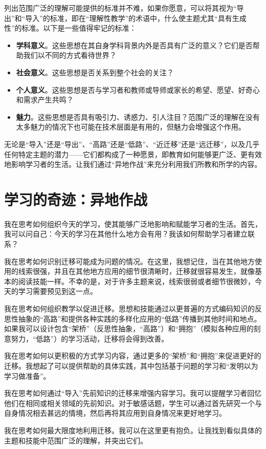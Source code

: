 列出范围广泛的理解可能提供的标准并不难，如果你愿意，可以将其视为“导出”和“导入”的标准，即在“理解性教学”的术语中，什么使主题尤其“具有生成性”的标准。以下是一些值得牢记的标准：
\begin{itemize}
    \item \textbf{学科意义}。这些思想在其自身学科背景内外是否具有广泛的意义？它们是否帮助我们以不同的方式看待世界？
    \item \textbf{社会意义}。这些思想是否关系到整个社会的关注？
    \item \textbf{个人意义}。这些思想是否与学习者和教师或导师或家长的希望、愿望、好奇心和需求产生共鸣？
    \item \textbf{魅力}。这些思想是否具有吸引力、诱惑力、引人注目？范围广泛的理解在没有太多魅力的情况下也可能在技术层面是有用的，但魅力会增强这个作用。
\end{itemize}

无论是“导入”还是“导出”、“高路”还是“低路”、“近迁移”还是“远迁移”，以及几乎任何特定主题的潜力——它们都构成了一种愿景，即教育如何能够更广泛、更有效地影响学习者的生活。让我们通过“异地作战”来充分利用我们所教和所学的内容。

\section*{学习的奇迹：异地作战}

我在思考如何组织今天的学习，使其能够广泛地影响和赋能学习者的生活。首先，我可以问自己：今天的学习在其他什么地方会有用？我该如何帮助学习者建立联系？

我在思考如何识别迁移可能成为问题的情况。在这里，我想记住，当在其他地方使用的线索很强，并且在其他地方应用的细节很清晰时，迁移就很容易发生，就像基本的阅读技能一样。不幸的是，对于许多主题来说，线索很弱或者细节很微妙，今天的学习需要预见到这一点。

我在思考如何组织教学以促进迁移。思想和技能通过以更普遍的方式编码知识的反思性抽象的“高路”和提供各种实践的多样化应用的“低路”传播到其他时间和地点。如果我可以设计包含“架桥”（反思性抽象，“高路”）和“拥抱”（模拟各种应用的刻意努力，“低路”）的学习活动，迁移将会得到改善。

我在思考如何以更积极的方式学习内容，通过更多的“架桥”和“拥抱”来促进更好的迁移。我想起了可以提供帮助的具体实践，其中包括基于问题的学习和“发明以为学习做准备”。

我在思考如何通过“导入”先前知识的迁移来增强内容学习。我可以提醒学习者回忆他们在相同或相关领域的先前知识。对于敏感话题，学生可以通过首先研究一个与自身情况相去甚远的情境，然后再将其应用到自身情况来更好地学习。

我在思考如何最大限度地利用迁移。我可以在这里更有抱负。让我找到看似具体的主题和技能中范围广泛的理解，并突出它们。

